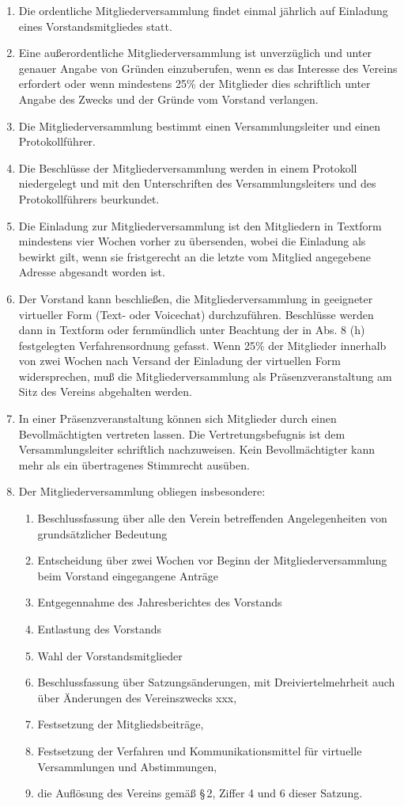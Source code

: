 \documentclass[12pt,a4paper]{article}
\begin{document}
\begin{enumerate}
\item Die ordentliche Mitgliederversammlung findet einmal jährlich auf Einladung eines Vorstandsmitgliedes statt.
\item Eine außerordentliche Mitgliederversammlung ist unverzüglich und unter genauer Angabe von Gründen einzuberufen, wenn es das Interesse des Vereins erfordert oder wenn mindestens 25\% der Mitglieder dies schriftlich unter Angabe des Zwecks und der Gründe vom Vorstand verlangen.
\item Die Mitgliederversammlung bestimmt einen Versammlungsleiter und einen Protokollführer.
\item Die Beschlüsse der Mitgliederversammlung werden in einem Protokoll niedergelegt und mit den Unterschriften des Versammlungsleiters und des Protokollführers beurkundet.
\item Die Einladung zur Mitgliederversammlung ist den Mitgliedern in Textform mindestens vier Wochen vorher zu übersenden, wobei die Einladung als bewirkt gilt, wenn sie fristgerecht an die letzte vom Mitglied angegebene Adresse abgesandt worden ist.
\item Der Vorstand kann beschließen, die Mitgliederversammlung in geeigneter virtueller Form (Text- oder Voicechat) durchzuführen. Beschlüsse werden dann in Textform oder fernmündlich unter Beachtung der in Abs. 8 (h) festgelegten Verfahrensordnung gefasst. Wenn 25\% der Mitglieder innerhalb von zwei Wochen nach Versand der Einladung der virtuellen Form widersprechen, muß die Mitgliederversammlung als Präsenzveranstaltung am Sitz des Vereins abgehalten werden.
\item In einer Präsenzveranstaltung können sich Mitglieder durch einen Bevollmächtigten vertreten lassen. Die Vertretungsbefugnis ist dem Versammlungsleiter schriftlich nachzuweisen. Kein Bevollmächtigter kann mehr als ein übertragenes Stimmrecht ausüben.
\item Der Mitgliederversammlung obliegen insbesondere:
\begin{enumerate}
\item Beschlussfassung über alle den Verein betreffenden Angelegenheiten von grundsätzlicher Bedeutung
\item Entscheidung über zwei Wochen vor Beginn der Mitgliederversammlung beim Vorstand eingegangene Anträge
\item Entgegennahme des Jahresberichtes des Vorstands
\item Entlastung des Vorstands
\item Wahl der Vorstandsmitglieder
\item Beschlussfassung über Satzungsänderungen, mit Dreiviertelmehrheit auch über Änderungen des Vereinszwecks xxx,
\item Festsetzung der Mitgliedsbeiträge,
\item Festsetzung der Verfahren und Kommunikationsmittel für virtuelle Versammlungen und Abstimmungen, 
\item die Auflösung des Vereins gemäß §\,2, Ziffer 4 und 6 dieser Satzung.
\end{enumerate}
\end{enumerate}
\end{document}
